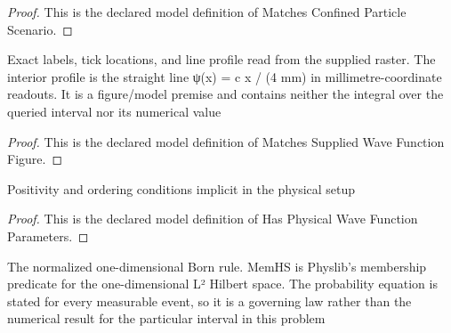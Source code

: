 \begin{proof}
  This is the declared model definition of Matches Confined Particle Scenario.
\end{proof}
\begin{definition}
  \label{def:physics:phyx-mini-0652:phyxminiproblems-problemphyxmini0652-matchessuppliedwavefunctionfigure}
  Exact labels, tick locations, and line profile read from the supplied raster. The interior profile is the straight line ψ(x) = c x / (4 mm) in millimetre-coordinate readouts. It is a figure/model premise and contains neither the integral over the queried interval nor its numerical value
\end{definition}
\begin{proof}
  This is the declared model definition of Matches Supplied Wave Function Figure.
\end{proof}
\begin{definition}
  \label{def:physics:phyx-mini-0652:phyxminiproblems-problemphyxmini0652-hasphysicalwavefunctionparameters}
  Positivity and ordering conditions implicit in the physical setup
\end{definition}
\begin{proof}
  This is the declared model definition of Has Physical Wave Function Parameters.
\end{proof}
\begin{definition}
  \label{def:physics:phyx-mini-0652:phyxminiproblems-problemphyxmini0652-satisfiesnormalizedbornpositionlaw}
  The normalized one-dimensional Born rule. MemHS is Physlib's membership predicate for the one-dimensional L² Hilbert space. The probability equation is stated for every measurable event, so it is a governing law rather than the numerical result for the particular interval in this problem
\end{definition}
